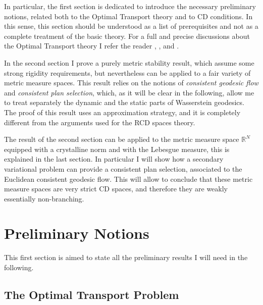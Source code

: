 \documentclass[11pt,twoside,a4paper]{article}
\newcommand{\R}{\mathbb{R}}
\theoremstyle{theorem}
\theoremstyle{definition}
\theoremstyle{remark}
\theoremstyle{proof}
\begin{document}
In particular, the first section is dedicated to introduce the necessary preliminary notions, related both to the Optimal Transport theory and to CD conditions. In this sense, this section should be understood as a list of prerequisites and not as a complete treatment of the basic theory. For a full and precise discussions about the Optimal Transport theory I refer the reader \cite{AmbrosioNotes2}, \cite{ambrosio2013user}, \cite{villani2003} and \cite{villani2008}.

In the second section I prove a purely metric stability result, which assume some strong rigidity requirements, but nevertheless can be applied to a fair variety of metric measure spaces. This result relies on the notions of \textit{consistent geodesic flow} and \textit{consistent plan selection}, which, as it will be clear in the following, allow me to treat separately the dynamic and the static parts of Wasserstein geodesics. The proof of this result uses an approximation strategy, and it is completely different from the arguments used for the RCD spaces theory.

The result of the second section can be applied to the metric measure space $\R^N$ equipped with a crystalline norm and with the Lebesgue measure, this is explained in the last section. In particular I will show how a secondary variational problem can provide a consistent plan selection, associated to the Euclidean consistent geodesic flow. This will allow to conclude that these metric measure spaces are very strict CD spaces, and therefore they are weakly essentially non-branching.



\section{Preliminary Notions}
This first section is aimed to state all the preliminary results I will need in the following.




\subsection{The Optimal Transport Problem}
\end{document}
